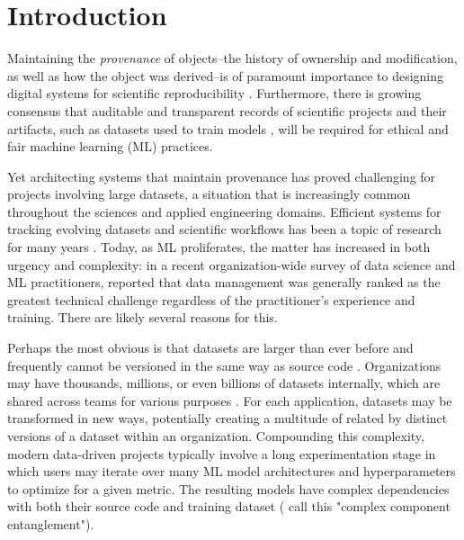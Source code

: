 \documentclass[10pt,sigconf, authordraft]{acmart}
\begin{document}


\maketitle

\section{Introduction}
Maintaining the \textit{provenance} of objects--the history of ownership and modification, as well as how the object was derived--is of paramount importance to designing digital systems for scientific reproducibility \cite{Muniswamy-Reddy2006Provenance-awareSystems,Davidson2008ProvenanceOpportunities,NationalAcademiesofSciences2019ReproducibilityScience}. Furthermore, there is growing consensus that auditable and transparent records of scientific projects and their artifacts, such as datasets used to train models \cite{GebruDatasheetsDatasets}, will be required for ethical and fair machine learning (ML) practices. 

Yet architecting systems that maintain provenance has proved challenging for projects involving large datasets, a situation that is increasingly common throughout the sciences and applied engineering domains. Efficient systems for tracking evolving datasets and scientific workflows has been a topic of research for many years \cite{Davidson2007ProvenanceSystems.,Azsoyoglu1995TemporalSurvey,Salzberg1999ComparisonData,Bhattacherjee2015PrinciplesTradeoff, Moreau2011Thev1.1}. Today, as ML proliferates, the matter has increased in both urgency and complexity: in a recent organization-wide survey of data science and ML practitioners, \citet{Amershi2019SoftwareStudy} reported that data management was generally ranked as the greatest technical challenge regardless of the practitioner's experience and training. There are likely several reasons for this. 

Perhaps the most obvious is that datasets are larger than ever before and frequently cannot be versioned in the same way as source code \cite{Bhattacherjee2015PrinciplesTradeoff}. Organizations may have thousands, millions, or even billions of datasets internally, which are shared across teams for various purposes \cite{Halevy2016Goods:Datasets}. For each application, datasets may be transformed in new ways, potentially creating a multitude of related by distinct versions of a dataset within an organization.  Compounding this complexity, modern data-driven projects typically involve a long experimentation stage in which users may iterate over many ML model architectures and hyperparameters to optimize for a given metric. The resulting models have complex dependencies with both their source code and training dataset (\citet{Amershi2019SoftwareStudy} call this "complex component entanglement"). 
\end{document}

